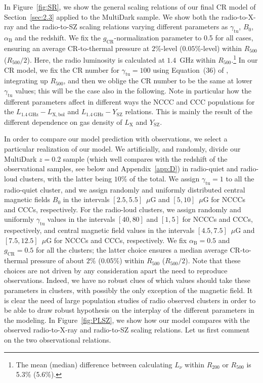 \documentclass[traditabstract]{aa}
\newcommand{\rmn}{\mathrm}
\begin{document}
In Figure~\ref{fig:SR}, we show the general scaling relations of our final CR model of Section~\ref{sec:2.3} applied to the MultiDark sample. We show both the radio-to-X-ray  and the radio-to-SZ scaling relations varying different parameters as $\gamma_{\rmn{tu}}$, $B_{0}$, $\alpha_{\rmn{B}}$ and the redshift. We fix the $g_{\rmn{CR}}$-normalization parameter to 0.5 for all cases, ensuring an average CR-to-thermal pressure at $2\%$-level ($0.05\%$-level) within $R_{500}$ ($R_{500}/2$). Here, the radio luminosity is calculated at $1.4$~GHz within $R_{500}.$\footnote{The mean (median) difference between calculating $L_{\nu}$ within $R_{200}$ or $R_{500}$ is 5.3\% (5.6\%).} In our CR model, we fix the CR number for $\gamma_{\rmn{tu}}=100$ using Equation~(36) of \cite{2011A&A...527A..99E}, integrating up $R_{500}$, and then we oblige the CR number to be the same at lower $\gamma_{\rmn{tu}}$ values; this will be the case also in the following. Note in particular how the different parameters affect in different ways the NCCC and CCC populations for the $L_{1.4~\rmn{GHz}}-L_{\rmn{X,bol}}$ and $L_{1.4~\rmn{GHz}}-Y_{\rmn{SZ}}$ relations. This is mainly the result of the different dependence on gas density of $L_{\rmn{X}}$ and $Y_{\rmn{SZ}}$.

In order to compare our model prediction with observations, we select a particular realization of our model. We artificially, and randomly, divide our MultiDark $z=0.2$ sample (which well compares with the redshift of the observational samples, see below and Appendix~\ref{app:D}) in radio-quiet and radio-loud clusters, with the latter being $10\%$ of the total. We assign $\gamma_{\rmn{tu}}=1$ to all the radio-quiet cluster, and we assign randomly and uniformly distributed central magnetic fields $B_0$ in the intervals $[2.5,5.5]$~$\mu$G and $[5,10]$~$\mu$G for NCCCs and CCCs, respectively. For the radio-loud clusters, we assign randomly and uniformly $\gamma_{\rmn{tu}}$ values in the intervals $[40,80]$ and $[1,5]$ for NCCCs and CCCs, respectively, and central magnetic field values in the intervals $[4.5,7.5]$~$\mu$G and $[7.5,12.5]$~$\mu$G for NCCCs and CCCs, respectively. We fix $\alpha_{\rmn{B}}=0.5$ and $g_{\rmn{CR}}=0.5$ for all the clusters; the latter choice ensures a median average CR-to-thermal pressure of about $2\%$ ($0.05\%$) within $R_{500}$ ($R_{500}/2$). Note that these choices are not driven by any consideration apart the need to reproduce observations. Indeed, we have no robust clues of which values should take these parameters in clusters, with possibly the only exception of the magnetic field. It is clear the need of large population studies of radio observed clusters in order to be able to draw robust hypothesis on the interplay of the different parameters in the modeling. In Figure~\ref{fig:PLSZ}, we show how our model compares with the observed radio-to-X-ray and radio-to-SZ scaling relations. Let us first comment on the two observational relations.
 
\end{document}
